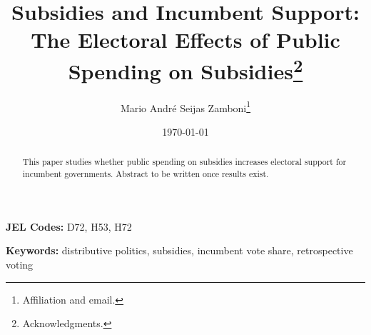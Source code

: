 \documentclass[12pt]{article}
\title{Subsidies and Incumbent Support: The Electoral Effects of Public Spending on Subsidies\thanks{Acknowledgments.}}
\author{
Mario Andr\'e Seijas Zamboni\thanks{Affiliation and email.}
}
\date{\today}
\begin{document}
\maketitle
\thispagestyle{empty}

\begin{abstract}
\noindent \singlespacing
This paper studies whether public spending on subsidies increases electoral support for incumbent governments. Abstract to be written once results exist.
\end{abstract}

\vspace{1em}
\noindent \textbf{JEL Codes:} D72, H53, H72

\vspace{0.5em}
\noindent \textbf{Keywords:} distributive politics, subsidies, incumbent vote share, retrospective voting

\newpage
\setcounter{page}{1}










\clearpage
\small \printbibliography


\end{document}
